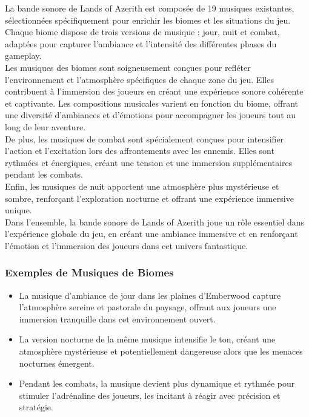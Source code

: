 La bande sonore de Lands of Azerith est composée de 19 musiques existantes, sélectionnées spécifiquement pour enrichir les biomes et les situations du jeu.
\\

Chaque biome dispose de trois versions de musique : jour, nuit et combat, adaptées pour capturer l'ambiance et l'intensité des différentes phases du gameplay.
\\

Les musiques des biomes sont soigneusement conçues pour refléter l'environnement et l'atmosphère spécifiques de chaque zone du jeu. Elles contribuent à l'immersion des joueurs en créant une expérience sonore cohérente et captivante. 
Les compositions musicales varient en fonction du biome, offrant une diversité d'ambiances et d'émotions pour accompagner les joueurs tout au long de leur aventure.
\\

De plus, les musiques de combat sont spécialement conçues pour intensifier l'action et l'excitation lors des affrontements avec les ennemis. 
Elles sont rythmées et énergiques, créant une tension et une immersion supplémentaires pendant les combats.
\\

Enfin, les musiques de nuit apportent une atmosphère plus mystérieuse et sombre, renforçant l'exploration nocturne et offrant une expérience immersive unique.
\\

Dans l'ensemble, la bande sonore de Lands of Azerith joue un rôle essentiel dans l'expérience globale du jeu, en créant une ambiance immersive et en renforçant l'émotion et l'immersion des joueurs dans cet univers fantastique.

\subsubsection{Exemples de Musiques de Biomes}

\begin{itemize}

      \item La musique d'ambiance de jour dans les plaines d'Emberwood capture l'atmosphère sereine et pastorale du paysage, offrant aux joueurs une immersion tranquille dans cet environnement ouvert.
            \\

      \item La version nocturne de la même musique intensifie le ton, créant une atmosphère mystérieuse et potentiellement dangereuse alors que les menaces nocturnes émergent.
            \\

      \item Pendant les combats, la musique devient plus dynamique et rythmée pour stimuler l'adrénaline des joueurs, les incitant à réagir avec précision et stratégie.
            \\

\end{itemize}

